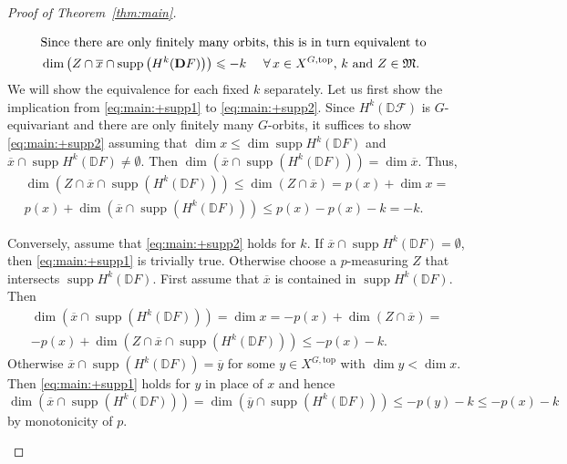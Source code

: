 \documentclass{compositio}
\theoremstyle{plain}
\theoremstyle{definition}
\theoremstyle{remark}
\newcommand\sheaf{\mathcal}
\newcommand\supp{\operatorname{supp}}
\newcommand\dualize{\mathbb D}
\newcommand\measuringFam{\mathfrak M}
\newcommand\Xtop[1][X]{#1^{G,\mathrm{top}}}
\begin{document}
\begin{proof}[Proof of Theorem~\ref{thm:main}]
\begin{enumerate}
\begin{align}
        \intertext{Since there are only finitely many orbits, this is in turn equivalent to}
        \label{eq:main:+supp2}%
        & \dim\left( Z \cap  \overline x \cap  \supp\left( H^k(\dualize F) \right) \right) \leq  - k && \text{ $\forall\, x \in  \Xtop$, $k$ and $Z \in  \measuringFam$}.
    \end{align}
    We will show the equivalence for each fixed $k$ separately.
    Let us first show the implication from \eqref{eq:main:+supp1} to \eqref{eq:main:+supp2}.
    Since $H^k(\dualize \sheaf F)$ is $G$-equivariant and there are only finitely many $G$-orbits, it suffices to show \eqref{eq:main:+supp2} assuming that $\dim x \le \dim \supp H^k(\dualize F)$ and $\overline x \cap \supp H^k(\dualize F) \ne \emptyset$.
    Then $\dim\left(\overline x \cap  \supp\left( H^k(\dualize F) \right)\right) = \dim \overline x$.
    Thus,
    \begin{multline*}
        \dim\left(Z \cap  \overline x \cap  \supp\left( H^k(\dualize F) \right) \right) \le
        \dim(Z \cap  \overline x) =
        p(x) + \dim x = \\
        p(x) + \dim\left(\overline x \cap  \supp\left( H^k(\dualize F) \right)\right) \le
        p(x) - p(x) - k
        = -k.
    \end{multline*}
    
    Conversely, assume that \eqref{eq:main:+supp2} holds for $k$.
    If $\overline x \cap \supp H^k(\dualize F) = \emptyset$, then \eqref{eq:main:+supp1} is trivially true.
    Otherwise choose a $p$-measuring $Z$ that intersects $\supp H^k(\dualize F)$.
    First assume that $\overline x$ is contained in $\supp H^k(\dualize F)$.
    Then
    \begin{multline*}
        \dim\left(\overline x \cap  \supp\left( H^k(\dualize F) \right)\right) =
        \dim x =
        -p(x) + \dim(Z \cap  \overline x) = \\
        -p(x) + \dim\left(Z \cap  \overline x \cap  \supp\left( H^k(\dualize F) \right) \right) \le
        -p(x) - k.
    \end{multline*}
    Otherwise $\overline x \cap  \supp\left( H^k(\dualize F) \right) = \overline y$ for some $y \in  \Xtop$ with $\dim y < \dim x$.
    Then \eqref{eq:main:+supp1} holds for $y$ in place of $x$ and hence
    \[
    \dim\left( \overline x \cap  \supp\left( H^k(\dualize F) \right) \right) =
    \dim\left( \overline y \cap  \supp\left( H^k(\dualize F) \right) \right) \leq 
    -p(y) - k \leq 
    -p(x) - k
    \]
    by monotonicity of $p$.
    \qedhere
\end{enumerate}
\end{proof}
\end{document}
